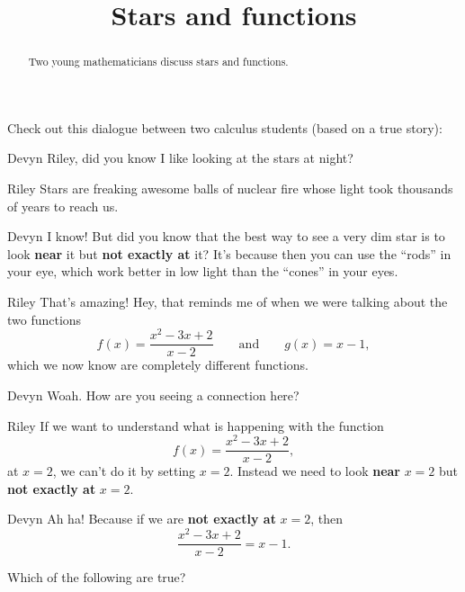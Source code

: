 \documentclass{ximera}
\title[Break-Ground:]{Stars and functions}
\begin{document}
\begin{abstract}
Two young mathematicians discuss stars and functions.
\end{abstract}
\maketitle

Check out this dialogue between two calculus students (based on a true
story):

\begin{dialogue}
\item[Devyn] Riley, did you know I like looking at the stars at night?
\item[Riley] Stars are freaking awesome balls of nuclear fire whose
  light took thousands of years to reach us.
\item[Devyn] I know! But did you know that the best way to see a very
  dim star is to look \textbf{near} it but \textbf{not exactly at} it? It's
  because then you can use the ``rods'' in your eye, which work better
  in low light than the ``cones'' in your eyes.
\item[Riley] That's amazing! Hey, that reminds me of when we were talking about the two functions
  \[
  f(x) = \frac{x^2-3x+2}{x-2}\qquad\text{and}\qquad g(x)= x-1,
  \]
  which we now know are completely different functions.
\item[Devyn] Woah. How are you seeing a connection here?
\item[Riley] If we want to understand what is happening with the
  function
  \[
  f(x) = \frac{x^2-3x+2}{x-2},
  \]
  at $x=2$, we can't do it by setting $x=2$. Instead we need to look
  \textbf{near} $x=2$ but \textbf{not exactly at} $x=2$.
  \item[Devyn] Ah ha! Because if we are \textbf{not exactly at} $x=2$,
    then
    \[
    \frac{x^2-3x+2}{x-2} = x-1.
    \]
\end{dialogue}

\begin{problem}
  Which of the following are true?
  \begin{multipleResponse}
  \end{multipleResponse}
\end{problem}




\end{document}

